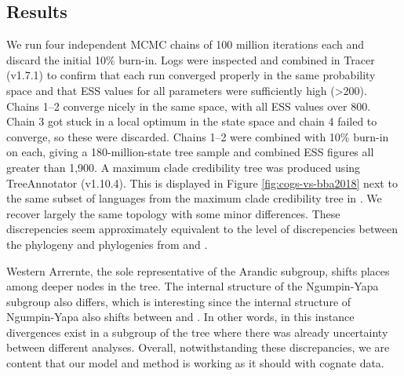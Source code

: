 \documentclass[]{article}
\begin{document}
\hypertarget{results-prelim-2}{%
\subsection{Results}\label{results-prelim-2}}

We run four independent MCMC chains of 100 million iterations each and discard the initial 10\% burn-in. Logs were inspected and combined in Tracer (v1.7.1) to confirm that each run converged properly in the same probability space and that ESS values for all parameters were sufficiently high (\textgreater{}200). Chains 1--2 converge nicely in the same space, with all ESS values over 800. Chain 3 got stuck in a local optimum in the state space and chain 4 failed to converge, so these were discarded. Chains 1--2 were combined with 10\% burn-in on each, giving a 180-million-state tree sample and combined ESS figures all greater than 1,900. A maximum clade credibility tree was produced using TreeAnnotator (v1.10.4). This is displayed in Figure \ref{fig:cogs-vs-bba2018} next to the same subset of languages from the maximum clade credibility tree in \textcite{bouckaert_origin_2018}. We recover largely the same topology with some minor differences. These discrepencies seem approximately equivalent to the level of discrepencies between the \textcite{bouckaert_origin_2018} phylogeny and phylogenies from \textcite{bowern_computational_2012} and \textcite{macklin-cordes_phylogenetic_2020}.

Western Arrernte, the sole representative of the Arandic subgroup, shifts places among deeper nodes in the tree. The internal structure of the Ngumpin-Yapa subgroup also differs, which is interesting since the internal structure of Ngumpin-Yapa also shifts between \textcite{bowern_computational_2012} and \textcite{bouckaert_origin_2018}. In other words, in this instance divergences exist in a subgroup of the tree where there was already uncertainty between different analyses. Overall, notwithstanding these discrepancies, we are content that our model and method is working as it should with cognate data.
\end{document}
